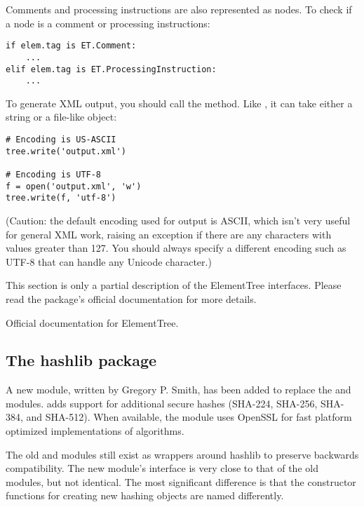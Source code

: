 \documentclass{howto}
\begin{document}
Comments and processing instructions are also represented as
 nodes.  To check if a node is a comment or processing
instructions:

\begin{verbatim}
if elem.tag is ET.Comment:
    ...
elif elem.tag is ET.ProcessingInstruction:
    ...
\end{verbatim}

To generate XML output, you should call the
 method.  Like ,
it can take either a string or a file-like object:

\begin{verbatim}
# Encoding is US-ASCII
tree.write('output.xml')

# Encoding is UTF-8
f = open('output.xml', 'w')
tree.write(f, 'utf-8')
\end{verbatim}

(Caution: the default encoding used for output is ASCII, which isn't
very useful for general XML work, raising an exception if there are
any characters with values greater than 127.  You should always
specify a different encoding such as UTF-8 that can handle any Unicode
character.)

This section is only a partial description of the ElementTree interfaces.
Please read the package's official documentation for more details.

\begin{seealso}

{Official documentation for ElementTree.}


\end{seealso}


\subsection{The hashlib package\label{module-hashlib}}

A new  module, written by Gregory P. Smith, 
has been added to replace the
 and  modules.   adds support
for additional secure hashes (SHA-224, SHA-256, SHA-384, and SHA-512).
When available, the module uses OpenSSL for fast platform optimized
implementations of algorithms.  

The old  and  modules still exist as wrappers
around hashlib to preserve backwards compatibility.  The new module's
interface is very close to that of the old modules, but not identical.
The most significant difference is that the constructor functions
for creating new hashing objects are named differently.
\end{document}
